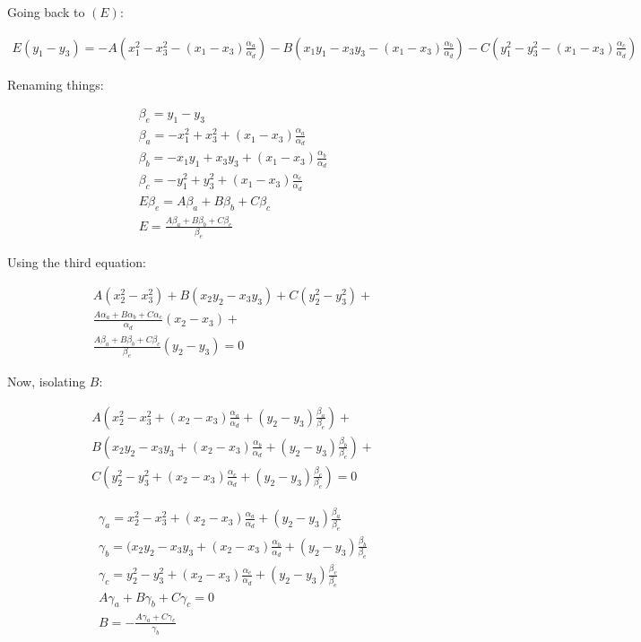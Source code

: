 \documentclass{article}
\begin{document}
	Going back to $(E)$:
	
	\begin{align*}
	E(y_1-y_3) = -A(x_1^2-x_3^2 - (x_1-x_3)\frac{\alpha_a}{\alpha_d}) - B(x_1y_1-x_3y_3 - (x_1-x_3)\frac{\alpha_b}{\alpha_d}) -C(y_1^2-y_3^2-(x_1-x_3)\frac{\alpha_c}{\alpha_d})
	\end{align*}
	
	Renaming things:
	
	\begin{align*}
	\beta_e = y_1-y_3\\
	\beta_a = -x_1^2+x_3^2 + (x_1-x_3)\frac{\alpha_a}{\alpha_d}\\
	\beta_b = -x_1y_1+x_3y_3 + (x_1-x_3)\frac{\alpha_b}{\alpha_d}\\
	\beta_c = -y_1^2+y_3^2+(x_1-x_3)\frac{\alpha_c}{\alpha_d}\\
	E\beta_e = A\beta_a + B\beta_b + C\beta_c\\
	E = \frac{A\beta_a + B\beta_b + C\beta_c}{\beta_e}
	\end{align*}
	
	Using the third equation:
	
	\begin{align*}
	A(x_2^2-x_3^2) + B(x_2y_2-x_3y_3) + C(y_2^2-y_3^2) +\\
	\frac{A\alpha_a + B\alpha_b + C\alpha_c}{\alpha_d}(x_2-x_3)+\\
	\frac{A\beta_a + B\beta_b + C\beta_c}{\beta_e}(y_2-y_3) = 0
	\end{align*}
	
	Now, isolating $B$:
	
	\begin{align*}
	A(x_2^2-x_3^2 + (x_2-x_3)\frac{\alpha_a}{\alpha_d} + (y_2-y_3)\frac{\beta_a}{\beta_e})+\\
	B(x_2y_2 -x_3y_3 + (x_2-x_3)\frac{\alpha_b}{\alpha_d} + (y_2-y_3)\frac{\beta_b}{\beta_e})+\\
	C(y_2^2-y_3^2 + (x_2-x_3)\frac{\alpha_c}{\alpha_d} + (y_2-y_3)\frac{\beta_c}{\beta_e})=0
	\end{align*}
	
	\begin{align*}
	\gamma_a = x_2^2-x_3^2 + (x_2-x_3)\frac{\alpha_a}{\alpha_d} + (y_2-y_3)\frac{\beta_a}{\beta_e}\\
	\gamma_b = (x_2y_2 -x_3y_3 + (x_2-x_3)\frac{\alpha_b}{\alpha_d} + (y_2-y_3)\frac{\beta_b}{\beta_e}\\
	\gamma_c = y_2^2-y_3^2 + (x_2-x_3)\frac{\alpha_c}{\alpha_d} + (y_2-y_3)\frac{\beta_c}{\beta_e}\\
	A\gamma_a + B\gamma_b + C\gamma_c = 0\\
	B = -\frac{A\gamma_a + C\gamma_c}{\gamma_b}
	\end{align*}
\end{document}
